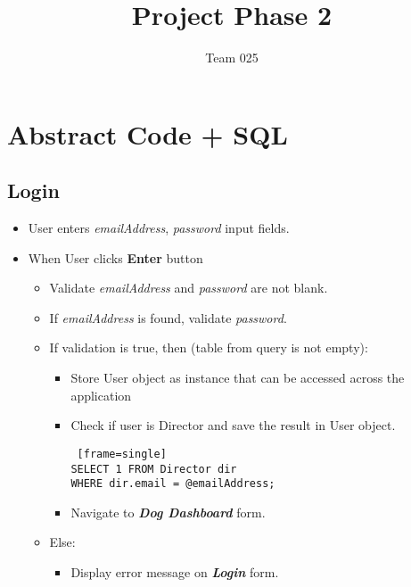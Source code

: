 \documentclass{article}
\title{Project Phase 2}
\author{Team 025}
\begin{document}
\maketitle
\tableofcontents
\newpage

\newpage
\section{Abstract Code + SQL}

\subsection{Login}
\begin{itemize}
    \item User enters \textit{emailAddress}, \textit{password} input fields.
    \item When User clicks \textbf{Enter} button
    \begin{itemize}


\begin{Verbatim} [frame=single]
SELECT v.email 
FROM Volunteer v 
JOIN User u ON v.email = u.email 
WHERE v.email = @emailAddress
    AND u.password = @password;
\end{Verbatim}
        
        \item Validate \textit{emailAddress} and \textit{password} are not blank.
        \item If \textit{emailAddress} is found, validate \textit{password}.
        \item If validation is true, then (table from query is not empty):
        \begin{itemize}
            \item Store User object as instance that can be accessed across the application
        \end{itemize}
        \begin{itemize}
            \item Check if user is Director and save the result in User object.
            \begin{Verbatim} [frame=single]
SELECT 1 FROM Director dir 
WHERE dir.email = @emailAddress;
            \end{Verbatim}
            \item Navigate to \textbf{\textit{Dog Dashboard}} form.
        \end{itemize}
        \item Else:
        \begin{itemize}
            \item Display error message on \textbf{\textit{Login}} form.
        \end{itemize}
    \end{itemize}
\end{itemize}
\end{document}
